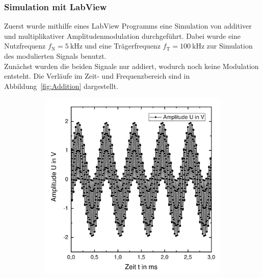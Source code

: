 \documentclass[a4paper,twoside,final]{article}
\begin{document}
\subsubsection{Simulation mit LabView}
Zuerst wurde mithilfe eines LabView Programms eine Simulation von additiver und multiplikativer Amplitudenmodulation durchgeführt. Dabei wurde eine Nutzfrequenz $f_\text{N} = \SI{5}{\kilo\hertz}$ und eine Trägerfrequenz $f_\text{T} = \SI{100}{\kilo\hertz}$ zur Simulation des modulierten Signals benutzt.\\
Zunächst wurden die beiden Signale nur addiert, wodurch noch keine Modulation entsteht. Die Verläufe im Zeit- und Frequenzbereich sind in Abbildung~\ref{fig:Addition} dargestellt.
\begin{figure}[htp]
    \centering
    \begin{subfigure}{0.45\textwidth}
        \includegraphics[width=\textwidth]{Bilder/Addition_Zeitverlauf.pdf}
    \end{subfigure}
    \begin{subfigure}{0.45\textwidth}

\end{subfigure}
\end{figure}
\end{document}
